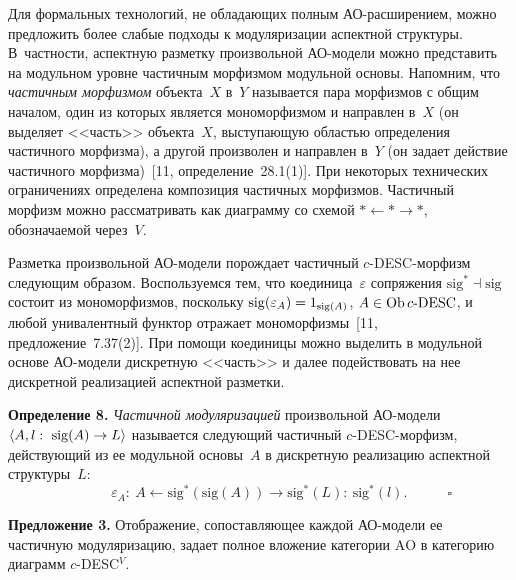 \begin{multicols}{2}
 Для формальных технологий, не обладающих полным
 АО-рас\-ши\-ре\-ни\-ем, можно предложить более слабые подходы к
модуляризации аспектной структуры. В~частности, аспектную разметку
произвольной АО-мо\-де\-ли можно представить на модульном уровне
частичным морфизмом модульной основы. Напомним, что \textit{частичным
морфизмом} объекта~$X$ в~$Y$ называется пара морфизмов с общим
началом, один из которых является мономорфизмом и направлен в~$X$ (он
выделяет <<часть>> объекта~$X$, выступающую областью определения
частичного морфизма), а другой произволен и направлен в~$Y$ (он задает
действие частичного морфизма)~[11, определение~28.1(1)]. При некоторых
технических ограничениях определена композиция частичных морфизмов.
Частичный морфизм можно рас\-смат\-ри\-вать как диаграмму со схемой $*
\leftarrow * \to *$, обозначаемой через~$V$.

 Разметка произвольной АО-мо\-де\-ли порождает частичный
 $c$-DESC-мор\-физм следующим образом. Воспользуемся тем, что
коединица~$\varepsilon$ сопряжения $\mathrm{sig}^* \dashv \mathrm{sig}$ состоит из
мономорфизмов, поскольку $\mathrm{sig}(\varepsilon_A) \hm= 1_{\mathrm{sig}(A)}$, $A\hm\in
\mathrm{Ob}\, c\mbox{-}\mathrm{DESC}$, и любой унивалентный функтор отражает
мономорфизмы~[11, предложение~7.37(2)]. При помощи коединицы можно
выделить в модульной основе АО-мо\-де\-ли дискретную <<часть>> и далее
подействовать на нее дискретной реализацией аспектной разметки.

 \medskip

 \noindent
 \textbf{Определение 8.} \textit{Частичной модуляризацией} произвольной
АО-мо\-де\-ли $\langle A, l:\ \mathrm{sig}(A) \hm\to L\rangle$ называется следующий
частичный $c$-DESC-мор\-физм, действующий из ее модульной основы~$A$
в дискретную реализацию аспектной структуры~$L$:
 $$
 ~~~~~~~~~~~~~~\varepsilon_A:\ A\leftarrow \mathrm{sig}^*(\mathrm{sig}(A)) \to \mathrm{sig}^*(L):\
\mathrm{sig}^*(l).~~~~~~~~~~~~~\square
 $$

 \noindent
 \textbf{Предложение 3.} Отображение, сопоставляющее каж\-дой
 АО-мо\-де\-ли ее частичную модуляризацию, задает полное вложение
категории $\mathrm{AO}$ в категорию диаграмм $c$-DESC$^V$.

 \medskip


\end{multicols}
